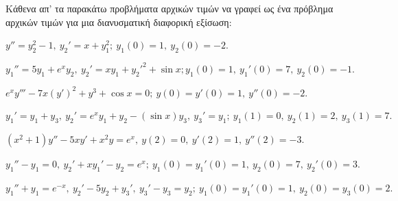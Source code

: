 \documentclass[a4paper,twoside,11pt]{book}
\begin{document}
\begin{Paradeigma}{Κάθενα απ' τα παρακάτω προβλήματα αρχικών τιμών να γραφεί ως ένα πρόβλημα αρχικών τιμών για μια διανυσματική διαφορική εξίσωση:}
\begin{rlist}
    \item $y''=y_2^2-1, \ y_2'=x+y_1^2; \ y_1(0)=1, \ y_2(0)=-2.$
    \item $y_1'' = 5y_1+e^x y_2, \ y_2' = xy_1+y_2'^2+\sin x; y_1(0)=1, \ y_1'(0)=7, \ y_2(0)=-1.$
    \item $e^x y''' - 7x(y')^2 + y^3 + \cos x = 0; \ y(0)=y'(0)=1, \ y''(0)=-2.$
    \item $y_1' = y_1+y_3, \ y_2' = e^x y_1 + y_2 - (\sin x)y_3, \ y_3' = y_1; \ y_1(1)=0, \ y_2(1)=2, \ y_3(1)=7.$
    \item $(x^2+1)y'' - 5xy' + x^2 y = e^x, \ y(2)=0, \ y'(2)=1, \ y''(2)=-3.$
    \item $y_1''-y_1=0, \ y_2'+xy_1'-y_2=e^x; \ y_1(0)=y_1'(0)=1, \ y_2(0)=7, \ y_2'(0)=3.$
    \item $y_1''+y_1=e^{-x}, \ y_2'-5y_2+y_3', \ y_3'-y_3=y_2; \ y_1(0)=y_1'(0)=1, \ y_2(0)=y_3(0)=2.$
\end{rlist}
\end{Paradeigma}
\end{document}
